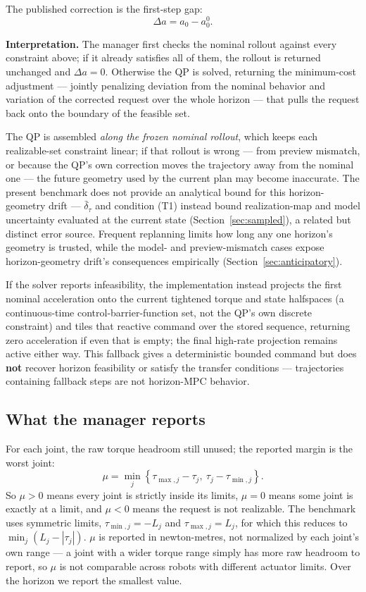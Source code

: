 \documentclass[journal]{IEEEtran}
\begin{document}
The published correction is the first-step gap:
\[
\Delta a=a_0-a^0_0.
\]

\textbf{Interpretation.} The manager first checks the nominal rollout against every constraint above; if it already satisfies all of them, the rollout is returned unchanged and $\Delta a=0$. Otherwise the QP is solved, returning the minimum-cost adjustment --- jointly penalizing deviation from the nominal behavior and variation of the corrected request over the whole horizon --- that pulls the request back onto the boundary of the feasible set.

The QP is assembled \emph{along the frozen nominal rollout}, which keeps each realizable-set constraint linear; if that rollout is wrong --- from preview mismatch, or because the QP's own correction moves the trajectory away from the nominal one --- the future geometry used by the current plan may become inaccurate. The present benchmark does not provide an analytical bound for this horizon-geometry drift --- $\bar\delta_\tau$ and condition (T1) instead bound realization-map and model uncertainty evaluated at the current state (Section~\ref{sec:sampled}), a related but distinct error source. Frequent replanning limits how long any one horizon's geometry is trusted, while the model- and preview-mismatch cases expose horizon-geometry drift's consequences empirically (Section~\ref{sec:anticipatory}).

If the solver reports infeasibility, the implementation instead projects the first nominal acceleration onto the current tightened torque and state halfspaces (a continuous-time control-barrier-function set, not the QP's own discrete constraint) and tiles that reactive command over the stored sequence, returning zero acceleration if even that is empty; the final high-rate projection remains active either way. This fallback gives a deterministic bounded command but does \textbf{not} recover horizon feasibility or satisfy the transfer conditions --- trajectories containing fallback steps are not horizon-MPC behavior.

\subsection{What the manager reports}
\label{sec:reports}

For each joint, the raw torque headroom still unused; the reported margin is the worst joint:
\[
\mu=\min_j\left\{\tau_{\max,j}-\tau_j,\ \tau_j-\tau_{\min,j}\right\}.
\]
So $\mu>0$ means every joint is strictly inside its limits, $\mu=0$ means some joint is exactly at a limit, and $\mu<0$ means the request is not realizable. The benchmark uses symmetric limits, $\tau_{\min,j}=-L_j$ and $\tau_{\max,j}=L_j$, for which this reduces to $\min_j(L_j-|\tau_j|)$. $\mu$ is reported in newton-metres, not normalized by each joint's own range --- a joint with a wider torque range simply has more raw headroom to report, so $\mu$ is not comparable across robots with different actuator limits. Over the horizon we report the smallest value.
\end{document}
